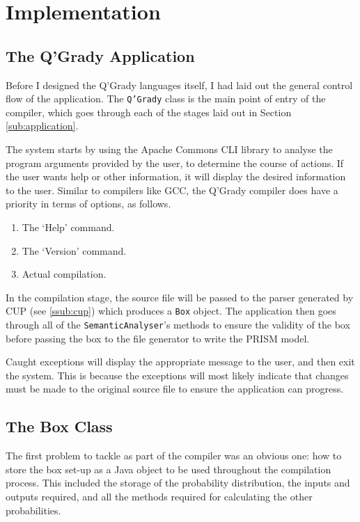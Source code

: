 \documentclass[report.tex]{subfiles}
\begin{document}

\section{Implementation} %
\label{sec:implementation}

\subsection{The Q'Grady Application} %
\label{sub:the_q_grady_application}
Before I designed the Q'Grady languages itself, I had laid out the general
control flow of the application. The \texttt{Q'Grady} class is the main point of
entry of the compiler, which goes through each of the stages laid out in Section
\ref{sub:application}.

The system starts by using the Apache Commons CLI library to analyse the
program arguments provided by the user, to determine the course of actions. If
the user wants help or other information, it will display the desired
information to the user. Similar to compilers like GCC, the Q'Grady compiler
does have a priority in terms of options, as follows.
\begin{enumerate}
    \item The `Help' command.
    \item The `Version' command.
    \item Actual compilation.
\end{enumerate}

In the compilation stage, the source file will be passed to the parser generated
by CUP (see \ref{ssub:cup}) which produces a \texttt{Box} object. The
application then goes through all of the \texttt{SemanticAnalyser}'s methods to
ensure the validity of the box before passing the box to the file generator to
write the PRISM model. 

Caught exceptions will display the appropriate message to the user, and then
exit the system. This is because the exceptions will most likely indicate that
changes must be made to the original source file to ensure the application can
progress.

\subsection{The Box Class} %
\label{sub:the_box_class}
The first problem to tackle as part of the compiler was an obvious one: how to
store the box set-up as a Java object to be used throughout the compilation
process. This included the storage of the probability distribution, the inputs
and outputs required, and all the methods required for calculating the other
probabilities.
\end{document}
